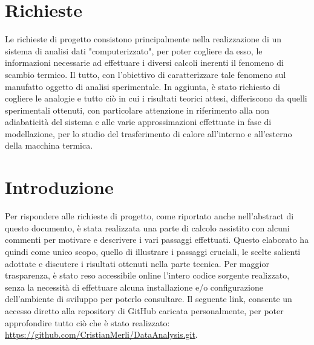 \documentclass[a4paper,10pt]{article}                                                                                       %
\begin{document}
\section{Richieste}                                                                                                         %
\label{sec:project_request}                                                                                                 %
  Le richieste di progetto consistono principalmente nella realizzazione di un sistema di analisi dati "computerizzato",
  per poter cogliere da esso, le informazioni necessarie ad effettuare i diversi calcoli inerenti il fenomeno di scambio
  termico. Il tutto, con l'obiettivo di caratterizzare tale fenomeno sul manufatto oggetto di analisi sperimentale. In
  aggiunta, è stato richiesto di cogliere le analogie e tutto ciò in cui i risultati teorici attesi, differiscono da
  quelli sperimentali ottenuti, con particolare attenzione in riferimento alla non adiabaticità del sistema e alle varie
  approssimazioni effettuate in fase di modellazione, per lo studio del trasferimento di calore all'interno e all'esterno
  della macchina termica.

\section{Introduzione}                                                                                                      %
\label{sec:introduction}                                                                                                    %
  Per rispondere alle richieste di progetto, come riportato anche nell'abstract di questo documento, è stata
  realizzata una parte di calcolo assistito con alcuni commenti per motivare e descrivere i vari passaggi effettuati.
  Questo elaborato ha quindi come unico scopo, quello di illustrare i passaggi cruciali, le scelte salienti adottate e
  discutere i risultati ottenuti nella parte tecnica. Per maggior trasparenza, è stato reso accessibile online l'intero
  codice sorgente realizzato, senza la necessità di effettuare alcuna installazione e/o configurazione dell'ambiente di
  sviluppo per poterlo consultare. Il seguente link, consente un accesso diretto alla repository di GitHub caricata
  personalmente, per poter approfondire tutto ciò che è stato realizzato:
  \href{https://github.com/CristianMerli/DataAnalysis.git}{https://github.com/CristianMerli/DataAnalysis.git}.
\end{document}
